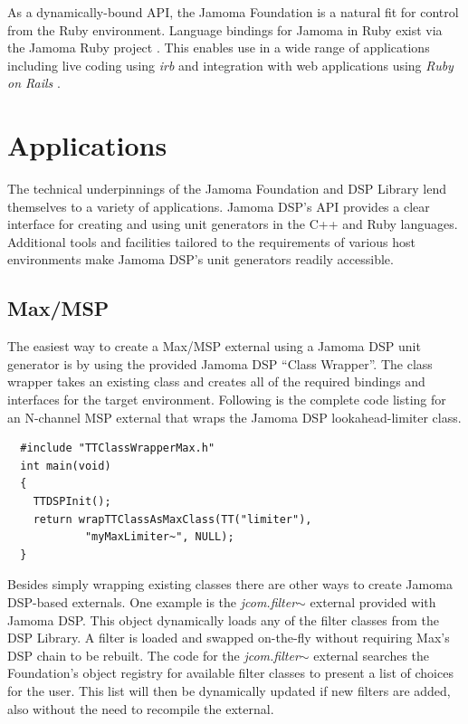 \documentclass[twoside,10pt]{article}
\begin{document}
As a dynamically-bound API, the Jamoma Foundation is a natural fit for control from the Ruby environment.  Language bindings for Jamoma in Ruby exist via the Jamoma Ruby project \cite{web14}.  This enables use in a wide range of applications including live coding using \emph{irb} \cite{web15} and integration with web applications using \emph{Ruby on Rails} \cite{web16}.




\section{Applications} %

The technical underpinnings of the Jamoma Foundation and DSP Library lend themselves to a variety of applications. 
Jamoma DSP's API provides a clear interface for creating and using unit generators in the C++ and Ruby languages.  Additional tools and facilities tailored to the requirements of various host environments make Jamoma DSP's unit generators readily accessible.


\subsection{Max/MSP} \label{sec:classwrapper}

The easiest way to create a Max/MSP external using a Jamoma DSP unit generator is by using the provided Jamoma DSP ``Class Wrapper''.   The class wrapper  takes an existing class and creates all of the required bindings and interfaces for the target environment.  Following is the complete code listing for an N-channel MSP external that wraps the Jamoma DSP lookahead-limiter class.

\begin{lstlisting}
  #include "TTClassWrapperMax.h"
  int main(void)
  {
    TTDSPInit();
    return wrapTTClassAsMaxClass(TT("limiter"), 
            "myMaxLimiter~", NULL);
  }
\end{lstlisting}

\noindent Besides simply wrapping existing classes there are other ways to create Jamoma DSP-based externals. One example is the \emph{jcom.filter$\sim$} external provided with Jamoma DSP.  This object dynamically loads any of the filter classes from the DSP Library. A filter is loaded and swapped on-the-fly without requiring Max's DSP chain to be rebuilt.  The code for the \emph{jcom.filter$\sim$} external searches the Foundation's object registry for available filter classes to present a list of choices for the user.  This list will then be dynamically updated if new filters are added, also without the need to recompile the external.   
\end{document}
